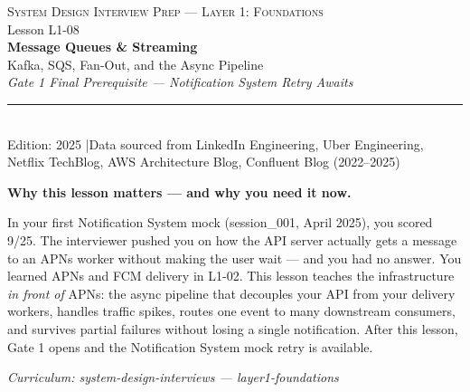\documentclass[11pt,a4paper]{article}
\begin{document}
\thispagestyle{empty}
\begin{center}
  \vspace*{2.5cm}
  {\footnotesize\color{primary!60}\textsc{System Design Interview Prep --- Layer 1: Foundations}}\\[0.6em]
  {\footnotesize\color{primary!50}Lesson L1-08}\\[2em]
  {\fontsize{26}{32}\selectfont\bfseries\color{primary} Message Queues \& Streaming}\\[0.8em]
  {\large\color{highlight} Kafka, SQS, Fan-Out, and the Async Pipeline}\\[0.5em]
  {\normalsize\color{primary!60}\textit{Gate 1 Final Prerequisite --- Notification System Retry Awaits}}\\[2.5em]
  \color{highlight!40}\rule{0.6\linewidth}{0.8pt}\\[2em]
  {\small\color{primary!70}
    Edition: 2025 \quad|\quad Data sourced from LinkedIn Engineering, Uber Engineering,\\
    Netflix TechBlog, AWS Architecture Blog, Confluent Blog (2022--2025)
  }\\[3em]
\end{center}

\begin{insightbox}
\textbf{Why this lesson matters --- and why you need it now.}

In your first Notification System mock (session\_001, April 2025), you scored 9/25. The interviewer pushed you on how the API server actually gets a message to an APNs worker without making the user wait --- and you had no answer. You learned APNs and FCM delivery in L1-02. This lesson teaches the infrastructure \textit{in front of} APNs: the async pipeline that decouples your API from your delivery workers, handles traffic spikes, routes one event to many downstream consumers, and survives partial failures without losing a single notification. After this lesson, Gate 1 opens and the Notification System mock retry is available.
\end{insightbox}

\vfill
\begin{center}
  {\small\color{primary!50}\textit{Curriculum: system-design-interviews --- layer1-foundations}}
\end{center}
\newpage

\tableofcontents
\newpage
\end{document}
